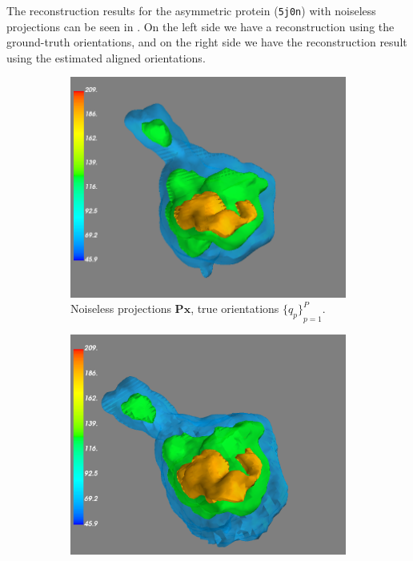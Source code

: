 The reconstruction results for the asymmetric protein (\texttt{5j0n}) with noiseless projections can be seen in . On the left side we have a reconstruction using the ground-truth orientations, and on the right side we have the reconstruction result using the estimated aligned orientations.

\begin{figure}[ht!]
    \centering
    \begin{subfigure}[b]{0.49\linewidth}
        \centering
        \includegraphics[width=0.90\linewidth]{figures/5j0n_reconstruction_GT}
        \caption{Noiseless projections $\mathbf{Px}$, true orientations ${\big\{q_p\big\}}_{p=1}^P$.}
    \end{subfigure}
    \hfill
    \begin{subfigure}[b]{0.49\linewidth}
        \centering
        \includegraphics[width=0.90\linewidth]{figures/5j0n_reconstruction_GT_noise16}

\end{subfigure}
\end{figure}
